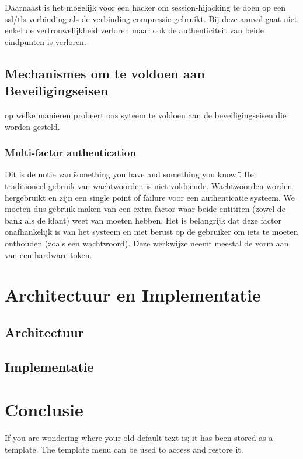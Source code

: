 \documentclass[11pt]{article}
\begin{document}
Daarnaast is het mogelijk voor een hacker om session-hijacking te doen op een ssl/tls verbinding als de verbinding compressie gebruikt. Bij deze aanval gaat niet enkel de vertrouwelijkheid verloren maar ook de authenticiteit van beide eindpunten is verloren.

\subsection{Mechanismes om te voldoen aan Beveiligingseisen}
op welke manieren probeert ons syteem te voldoen aan de beveiligingseisen die worden gesteld.

\subsubsection{Multi-factor authentication}
Dit is de notie van \"something you have and something you know \". 
Het traditioneel gebruik van wachtwoorden is niet voldoende. Wachtwoorden worden hergebruikt en zijn een single point of failure voor een authenticatie systeem. We moeten dus gebruik maken van een extra factor waar beide entititen (zowel de bank als de klant) weet van moeten hebben. Het is belangrijk dat deze factor onafhankelijk is van het systeem en niet berust op de gebruiker om iets te moeten onthouden (zoals een wachtwoord). Deze werkwijze neemt meestal de vorm aan van een hardware token.
\section{Architectuur en Implementatie}
\subsection{Architectuur}
\subsection{Implementatie}
\section{Conclusie}
If you are wondering where your old default text is; it has been stored as a template. The template menu can be used to access and restore it. 

{}

\end{document}
